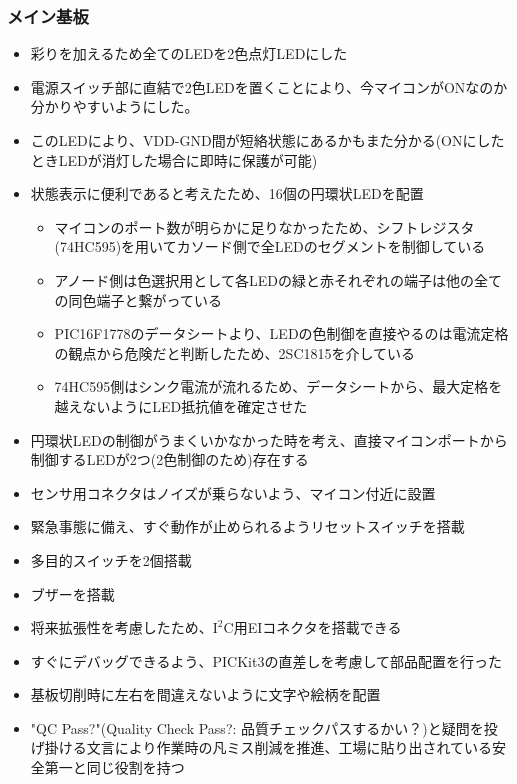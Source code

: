 \documentclass[a4paper]{ltjsarticle}
\begin{document}
\subsubsection{メイン基板}
\begin{itemize}
  \item 彩りを加えるため全てのLEDを2色点灯LEDにした
  \item 電源スイッチ部に直結で2色LEDを置くことにより、今マイコンがONなのか分かりやすいようにした。
  \item このLEDにより、VDD-GND間が短絡状態にあるかもまた分かる(ONにしたときLEDが消灯した場合に即時に保護が可能)
  \item 状態表示に便利であると考えたため、16個の円環状LEDを配置
  \begin{itemize}
    \item マイコンのポート数が明らかに足りなかったため、シフトレジスタ(74HC595)を用いてカソード側で全LEDのセグメントを制御している
    \item アノード側は色選択用として各LEDの緑と赤それぞれの端子は他の全ての同色端子と繋がっている
    \item PIC16F1778のデータシート\cite{ds:picEspI}より、LEDの色制御を直接やるのは電流定格の観点から危険だと判断したため、2SC1815を介している
    \item 74HC595側はシンク電流が流れるため、データシート\cite{ds:74hc595EspI}から、最大定格を越えないようにLED抵抗値を確定させた
  \end{itemize}
  \item 円環状LEDの制御がうまくいかなかった時を考え、直接マイコンポートから制御するLEDが2つ(2色制御のため)存在する
  \item センサ用コネクタはノイズが乗らないよう、マイコン付近に設置
  \item 緊急事態に備え、すぐ動作が止められるようリセットスイッチを搭載
  \item 多目的スイッチを2個搭載
  \item ブザーを搭載
  \item 将来拡張性を考慮したため、$\mathrm{I}^\mathrm{2}\mathrm{C}$用EIコネクタを搭載できる
  \item すぐにデバッグできるよう、PICKit3の直差しを考慮して部品配置を行った
  \item 基板切削時に左右を間違えないように文字や絵柄を配置
  \item "QC Pass?"(Quality Check Pass?: 品質チェックパスするかい？)と疑問を投げ掛ける文言により作業時の凡ミス削減を推進、工場に貼り出されている安全第一と同じ役割を持つ
\end{itemize}
\end{document}
